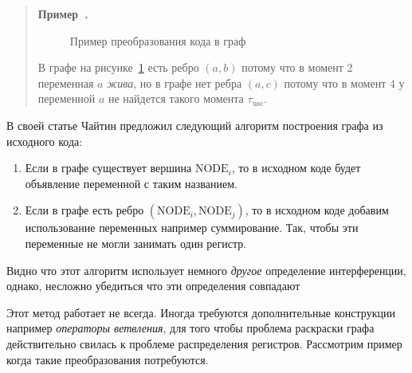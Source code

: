 \documentclass[12pt]{article}
\newcounter{example}
\newenvironment{example}[1][]{\refstepcounter{example}\par\medskip\noindent\begin{quote}
\textbf{Пример~\theexample. #1}\rmfamily}{\end{quote}\medskip}
\begin{document}
\begin{example}
    \begin{figure}[H]
        \centering
    \caption{Пример преобразования кода в граф}
    \label{fig:ex1}
    \end{figure}

    В графе на рисунке~\ref{fig:ex1} есть ребро $(a, b)$ потому что в момент 2 переменная $a$ \textit{жива}, но в графе нет ребра $(a, c)$
    потому что в момент 4 у переменной $a$ не найдется такого момента $\tau_{\text{use}}$.
\end{example}


В своей статье Чайтин предложил следующий алгоритм построения графа из исходного кода:

\begin{enumerate}
    \item Если в графе существует вершина $\text{NODE}_i$, то в исходном коде будет объявление переменной с таким
    названием.
    \item Если в графе есть ребро $(\text{NODE}_i, \text{NODE}_j)$, то в исходном коде добавим использование переменных
    например суммирование. Так, чтобы эти переменные не могли занимать один регистр.
\end{enumerate}

Видно что этот алгоритм использует немного \textit{другое} определение интерференции, однако, несложно убедиться что эти определения
совпадают

Этот метод работает не всегда. Иногда требуются дополнительные конструкции например \textit{операторы ветвления},
для того чтобы проблема раскраски графа действительно свилась к проблеме распределения регистров. Рассмотрим пример когда такие
преобразования потребуются.
\end{document}
